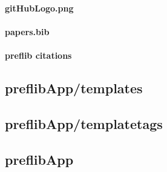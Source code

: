 \documentclass{report}
\begin{document}
	\paragraph*{\faFileO{} gitHubLogo.png}
	
	\paragraph*{\faFileO{} papers.bib}
	
	\paragraph*{\faFilesO{} preflib citations}
	
	
	\subsection*{\faFolderO{} preflibApp/templates}
	
	\subsection*{\faFolderO{} preflibApp/templatetags}
	
	\subsection*{\faFolderO{} preflibApp}
		
\end{document}
